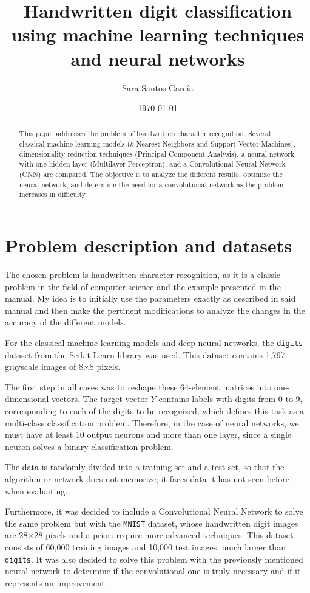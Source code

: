 \documentclass[11pt,a4paper]{article}
\title{\textbf{Handwritten digit classification using machine learning techniques and neural networks}}
\author{Sara Santos García}
\date{\today}
\begin{document}
\maketitle

\begin{abstract}
This paper addresses the problem of handwritten character recognition. Several classical machine learning models ($k$-Nearest Neighbors and Support Vector Machines), dimensionality reduction techniques (Principal Component Analysis), a neural network with one hidden layer (Multilayer Perceptron), and a Convolutional Neural Network (CNN) are compared. The objective is to analyze the different results, optimize the neural network, and determine the need for a convolutional network as the problem increases in difficulty.
\end{abstract}

\section{Problem description and datasets}
The chosen problem is handwritten character recognition, as it is a classic problem in the field of computer science and the example presented in the manual. My idea is to initially use the parameters exactly as described in said manual and then make the pertinent modifications to analyze the changes in the accuracy of the different models.

For the classical machine learning models and deep neural networks, the \texttt{digits} dataset from the Scikit-Learn library was used. This dataset contains 1,797 grayscale images of 8$\times$8 pixels.

The first step in all cases was to reshape these 64-element matrices into one-dimensional vectors. The target vector $Y$ contains labels with digits from 0 to 9, corresponding to each of the digits to be recognized, which defines this task as a multi-class classification problem. Therefore, in the case of neural networks, we must have at least 10 output neurons and more than one layer, since a single neuron solves a binary classification problem.

The data is randomly divided into a training set and a test set, so that the algorithm or network does not memorize; it faces data it has not seen before when evaluating.

Furthermore, it was decided to include a Convolutional Neural Network to solve the same problem but with the \texttt{MNIST} dataset, whose handwritten digit images are 28$\times$28 pixels and a priori require more advanced techniques. This dataset consists of 60,000 training images and 10,000 test images, much larger than \texttt{digits}. It was also decided to solve this problem with the previously mentioned neural network to determine if the convolutional one is truly necessary and if it represents an improvement.
\end{document}
